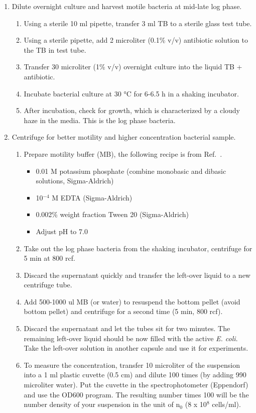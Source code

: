 \begin{enumerate}
  \item Dilute overnight culture and harvest motile bacteria at mid-late log phase.
  \begin{enumerate}
    \item Using a sterile 10 ml pipette, transfer 3 ml TB to a sterile glass test tube.
    \item Using a sterile pipette, add 2 microliter (0.1\% v/v) antibiotic solution to the TB in test tube.
    \item Transfer 30 microliter (1\% v/v) overnight culture into the liquid TB + antibiotic.
    \item Incubate bacterial culture at 30 °C for 6-6.5 h in a shaking incubator.
    \item After incubation, check for growth, which is characterized by a cloudy haze in the media. This is the log phase bacteria.
  \end{enumerate}
  \item Centrifuge for better motility and higher concentration bacterial sample.
  \begin{enumerate}
    \item Prepare motility buffer (MB), the following recipe is from Ref.~\cite{Peng2016}.
    \begin{itemize}
      \item 0.01 M potassium phosphate (combine monobasic and dibasic solutions, Sigma-Aldrich)
      \item 10$^{-4}$ M EDTA (Sigma-Aldrich)
      \item 0.002\% weight fraction Tween 20 (Sigma-Aldrich)
      \item Adjust pH to 7.0
    \end{itemize}
    \item Take out the log phase bacteria from the shaking incubator, centrifuge for 5 min at 800 rcf.
    \item Discard the supernatant quickly and transfer the left-over liquid to a new centrifuge tube.
    \item Add 500-1000 ul MB (or water) to resuspend the bottom pellet (avoid bottom pellet) and centrifuge for a second time (5 min, 800 rcf).
    \item Discard the supernatant and let the tubes sit for two minutes. The remaining left-over liquid should be now filled with the active \textit{E. coli}. Take the left-over solution in another capsule and use it for experiments.
    \item To measure the concentration, transfer 10 microliter of the suspension into a 1 ml plastic cuvette (0.5 cm) and dilute 100 times (by adding 990 microliter water). Put the cuvette in the spectrophotometer (Eppendorf) and use the OD600 program. The resulting number times 100 will be the number density of your suspension in the unit of n$_0$ (8 x 10$^8$ cells/ml).
  \end{enumerate}
\end{enumerate}








